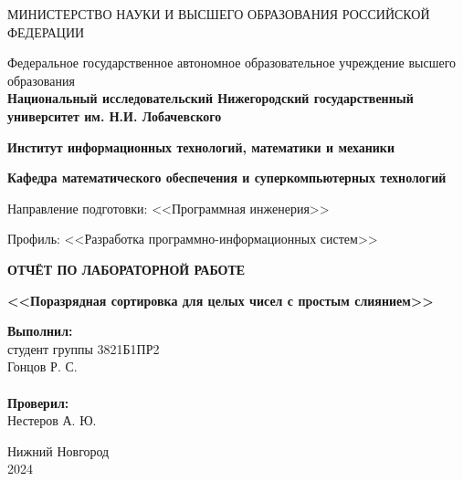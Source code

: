 \documentclass[]{article}
\theoremstyle{remark}
\theoremstyle{definition}
\begin{document}
\begin{titlepage}

\begin{center}
\MakeUppercase{Министерство науки и высшего образования Российской Федерации}
\end{center}

\begin{center}
Федеральное государственное автономное образовательное учреждение высшего образования \\
\textbf{Национальный исследовательский Нижегородский государственный университет им. Н.И. Лобачевского}
\end{center}

\begin{center}
\textbf{Институт информационных технологий, математики и механики}
\end{center}
\begin{center}
\textbf{Кафедра математического обеспечения и суперкомпьютерных технологий}
\end{center}
\begin{center}
Направление подготовки: <<Программная инженерия>>
\end{center}
\begin{center}
Профиль: <<Разработка программно-информационных систем>>
\end{center}

\vspace{3em}

\begin{center}
\textbf{\Large\MakeUppercase{Отчёт по лабораторной работе}} \\
\end{center}
\begin{center}
\textbf{\Large <<Поразрядная сортировка для целых чисел с простым слиянием>>} \\
\end{center}

\vspace{5em}

\newbox{\lbox}
\newlength{\maxl}
\setlength{\maxl}{\wd\lbox}
\hfill\parbox{7cm}{
\hspace*{5cm}\hspace*{-5cm}\textbf{Выполнил:} \\ студент группы 	3821Б1ПР2 \\ Гонцов Р. С.\\
\\

\hspace*{5cm}\hspace*{-5cm}\textbf{Проверил:} \\ Нестеров А. Ю.
}
\vspace{\fill}

\begin{center} Нижний Новгород \\ 2024 \end{center}

\end{titlepage}
\end{document}
